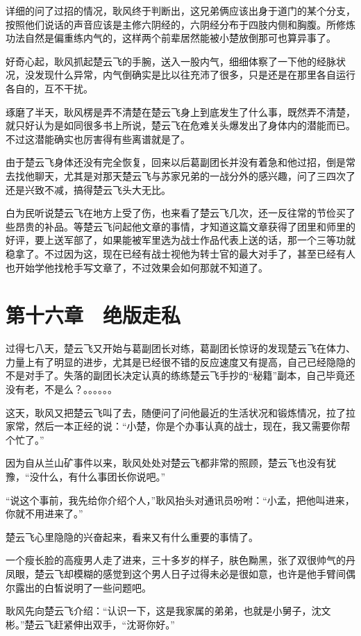 详细的问了过招的情况，耿风终于判断出，这兄弟俩应该出身于道门的某个分支，按照他们说话的声音应该是主修六阴经的，六阴经分布于四肢内侧和胸腹。所修炼功法自然是偏重练内气的，这样两个前辈居然能被小楚放倒那可也算异事了。

好奇心起，耿风抓起楚云飞的手腕，送入一股内气，细细体察了一下他的经脉状况，没发现什么异常，内气倒确实是比以往充沛了很多，只是还是在那里各自运行各自的，互不干扰。

琢磨了半天，耿风楞是弄不清楚在楚云飞身上到底发生了什么事，既然弄不清楚，就只好认为是如同很多书上所说，楚云飞在危难关头爆发出了身体内的潜能而已。不过这潜能确实也厉害得有些离谱就是了。

由于楚云飞身体还没有完全恢复，回来以后葛副团长并没有着急和他过招，倒是常去找他聊天，尤其是对那天楚云飞与苏家兄弟的一战分外的感兴趣，问了三四次了还是兴致不减，搞得楚云飞头大无比。

白为民听说楚云飞在地方上受了伤，也来看了楚云飞几次，还一反往常的节俭买了些昂贵的补品。等楚云飞问起他文章的事情，才知道这篇文章获得了团里和师里的好评，要上送军部了，如果能被军里选为战士作品代表上送的话，那一个三等功就稳拿了。不过因为这，现在已经有战士视他为转士官的最大对手了，甚至已经有人也开始学他找枪手写文章了，不过效果会如何那就不知道了。

\section{第十六章　绝版走私}

过得七八天，楚云飞又开始与葛副团长对练，葛副团长惊讶的发现楚云飞在体力、力量上有了明显的进步，尤其是已经很不错的反应速度又有提高，自己已经隐隐的不是对手了。失落的副团长决定认真的练练楚云飞手抄的“秘籍”副本，自己毕竟还没有老，不是么？。。。。。。

这天，耿风又把楚云飞叫了去，随便问了问他最近的生活状况和锻炼情况，拉了拉家常，然后一本正经的说：“小楚，你是个办事认真的战士，现在，我又需要你帮个忙了。”

因为自从兰山矿事件以来，耿风处处对楚云飞都非常的照顾，楚云飞也没有犹豫，“没什么，有什么事团长你说吧。”

“说这个事前，我先给你介绍个人，”耿风抬头对通讯员吩咐：“小孟，把他叫进来，你就不用进来了。”

楚云飞心里隐隐的兴奋起来，看来又有什么重要的事情了。

一个瘦长脸的高瘦男人走了进来，三十多岁的样子，肤色黝黑，张了双很帅气的丹凤眼，楚云飞却模糊的感觉到这个男人日子过得未必是很如意，也许是他手臂间偶尔露出的白皙说明了一些问题吧。

耿风先向楚云飞介绍：“认识一下，这是我家属的弟弟，也就是小舅子，沈文彬。”楚云飞赶紧伸出双手，“沈哥你好。”

